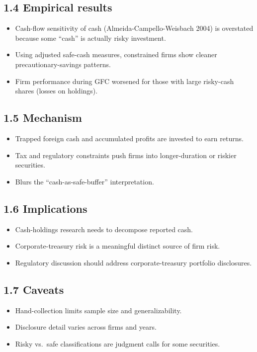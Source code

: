 \documentclass[11pt]{article}
\begin{document}
\subsection*{1.4 Empirical results}
\begin{itemize}
\item Cash-flow sensitivity of cash (Almeida-Campello-Weisbach 2004) is overstated because some ``cash'' is actually risky investment.
\item Using adjusted safe-cash measures, constrained firms show cleaner precautionary-savings patterns.
\item Firm performance during GFC worsened for those with large risky-cash shares (losses on holdings).
\end{itemize}

\subsection*{1.5 Mechanism}
\begin{itemize}
\item Trapped foreign cash and accumulated profits are invested to earn returns.
\item Tax and regulatory constraints push firms into longer-duration or riskier securities.
\item Blurs the ``cash-as-safe-buffer'' interpretation.
\end{itemize}

\subsection*{1.6 Implications}
\begin{itemize}
\item Cash-holdings research needs to decompose reported cash.
\item Corporate-treasury risk is a meaningful distinct source of firm risk.
\item Regulatory discussion should address corporate-treasury portfolio disclosures.
\end{itemize}

\subsection*{1.7 Caveats}
\begin{alertbox}
\begin{itemize}
\item Hand-collection limits sample size and generalizability.
\item Disclosure detail varies across firms and years.
\item Risky vs.\ safe classifications are judgment calls for some securities.
\end{itemize}
\end{alertbox}
\end{document}
